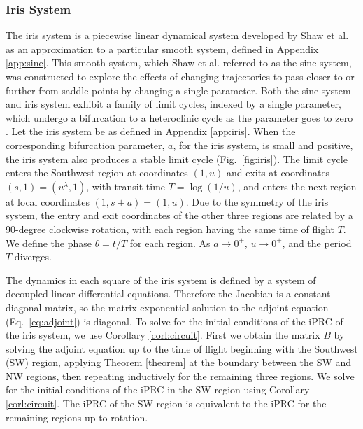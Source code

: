 \documentclass[12pt]{article}
\begin{document}
\subsubsection{Iris System}
 The iris system is a piecewise linear dynamical system developed by Shaw et al. as an approximation to a particular smooth system, defined in Appendix \ref{app:sine}.  This smooth system, which Shaw et al. referred to as the sine system, was constructed to explore the effects of changing trajectories to pass closer to or further from saddle points by changing a single parameter. Both the sine system and iris system exhibit a family of limit cycles, indexed by a single parameter, which undergo a bifurcation to a heteroclinic cycle as the parameter goes to zero \cite{ShawParkChielThomas2012SIADS}.  Let the iris system be as defined in Appendix \ref{app:iris}.  When the corresponding bifurcation parameter, $a$, for the iris system, is small and positive, the iris system also produces a stable limit cycle (Fig.~\ref{fig:iris}). The limit cycle enters the Southwest region at coordinates $(1,u)$ and exits at coordinates $(s,1)= (u^\lambda,1)$, with transit time $T = \log(1/u)$, and enters the next region at local 
coordinates $(1,s+a)=(1,u)$.  Due to the symmetry of the iris system, the entry and exit coordinates of the other three regions are related by a 90-degree clockwise rotation, with each region having the same time of flight $T$. We define the phase $\theta = t/
T$ for each region.  As $a \rightarrow 0^+$, $u \rightarrow 0^+$, and the period $T$ diverges.

The dynamics in each square of the iris system is defined by a system of decoupled linear differential equations.  Therefore the Jacobian is a constant diagonal matrix, so the matrix exponential solution to the adjoint equation (Eq.~\ref{eq:adjoint}) is diagonal.  To solve for the initial conditions of the iPRC of the iris system, we use Corollary \ref{corl:circuit}.  First we obtain the matrix $B$ by solving the adjoint equation up to the time of flight beginning with the Southwest (SW) region, applying Theorem \ref{theorem} at the boundary between the SW and NW regions, then repeating inductively for the remaining three regions.  We solve for the initial conditions of the iPRC in the SW region using Corollary \ref{corl:circuit}.  The iPRC of the SW region is equivalent to the iPRC for the remaining regions up to rotation.
\end{document}
